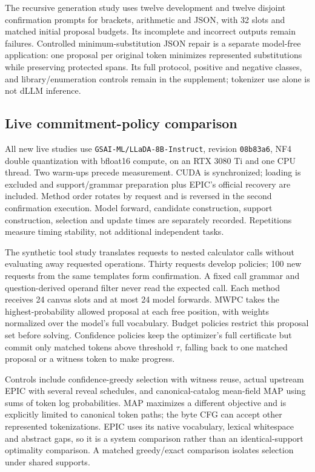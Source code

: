 The recursive generation study uses twelve development and twelve disjoint confirmation prompts for brackets, arithmetic and JSON, with 32 slots and matched initial proposal budgets. Its incomplete and incorrect outputs remain failures. Controlled minimum-substitution JSON repair is a separate model-free application: one proposal per original token minimizes represented substitutions while preserving protected spans. Its full protocol, positive and negative classes, and library/enumeration controls remain in the supplement; tokenizer use alone is not dLLM inference.

\subsection{Live commitment-policy comparison}

All new live studies use \texttt{GSAI-ML/LLaDA-8B-Instruct}, revision \texttt{08b83a6}, NF4 double quantization with bfloat16 compute, on an RTX 3080 Ti and one CPU thread. Two warm-ups precede measurement. CUDA is synchronized; loading is excluded and support/grammar preparation plus EPIC's official recovery are included. Method order rotates by request and is reversed in the second confirmation execution. Model forward, candidate construction, support construction, selection and update times are separately recorded. Repetitions measure timing stability, not additional independent tasks.

The synthetic tool study translates requests to nested calculator calls without evaluating away requested operations. Thirty requests develop policies; 100 new requests from the same templates form confirmation. A fixed call grammar and question-derived operand filter never read the expected call. Each method receives 24 canvas slots and at most 24 model forwards. MWPC takes the highest-probability allowed proposal at each free position, with weights normalized over the model's full vocabulary. Budget policies restrict this proposal set before solving. Confidence policies keep the optimizer's full certificate but commit only matched tokens above threshold $\tau$, falling back to one matched proposal or a witness token to make progress.

Controls include confidence-greedy selection with witness reuse, actual upstream EPIC with several reveal schedules, and canonical-catalog mean-field MAP using sums of token log probabilities. MAP maximizes a different objective and is explicitly limited to canonical token paths; the byte CFG can accept other represented tokenizations. EPIC uses its native vocabulary, lexical whitespace and abstract gaps, so it is a system comparison rather than an identical-support optimality comparison. A matched greedy/exact comparison isolates selection under shared supports.

